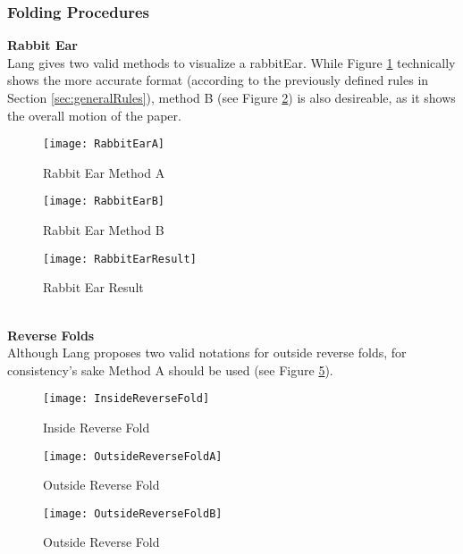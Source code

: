 \newpage
\subsubsection{Folding Procedures}
\textbf{Rabbit Ear}\\
Lang gives two valid methods to visualize a \gls{rabbitEar}. While Figure \ref{fig:rabbitEarA} technically shows the more accurate format (according to the previously defined rules in Section \ref{sec:generalRules}), method B (see Figure \ref{fig:rabbitEarB}) is also desireable, as it shows the overall motion of the paper.
\begin{figure*}[h]
    \centering
    \begin{subfigure}[b]{0.4\textwidth}
        \texttt{[image: RabbitEarA]}
        \caption{Rabbit Ear Method A}
        \label{fig:rabbitEarA}
    \end{subfigure}
    \begin{subfigure}[b]{0.52\textwidth}
        \texttt{[image: RabbitEarB]}
        \caption{Rabbit Ear Method B}
        \label{fig:rabbitEarB}
    \end{subfigure}
    \caption{Both methods show a rabbit ear fold}
    \label{fig:rabbitEarMethods}
\end{figure*}
\begin{figure}[h]
	\centering
	\texttt{[image: RabbitEarResult]}
	\caption{Rabbit Ear Result}
	\label{fig:rabbitEarResult}
\end{figure}\\
\newpage
\textbf{Reverse Folds}\\
Although Lang proposes two valid notations for outside reverse folds, for consistency's sake Method A should be used (see Figure \ref{fig:outsideReverseFoldA}).

\begin{figure*}[h]
	\centering
	\begin{subfigure}[b]{0.3\textwidth}
		\texttt{[image: InsideReverseFold]}
		\caption{Inside Reverse Fold}
		\label{fig:insideReverseFold}
	\end{subfigure}
	\begin{subfigure}[b]{0.3\textwidth}
		\texttt{[image: OutsideReverseFoldA]}
		\caption{Outside Reverse Fold}
		\label{fig:outsideReverseFoldA}
	\end{subfigure}
	\begin{subfigure}[b]{0.3\textwidth}
		\texttt{[image: OutsideReverseFoldB]}
		\caption{Outside Reverse Fold}
		\label{fig:outsideReverseFoldB}
	\end{subfigure}
	\caption{Different reverse folds}
	\label{fig:reverseFoldMethods}
\end{figure*}

